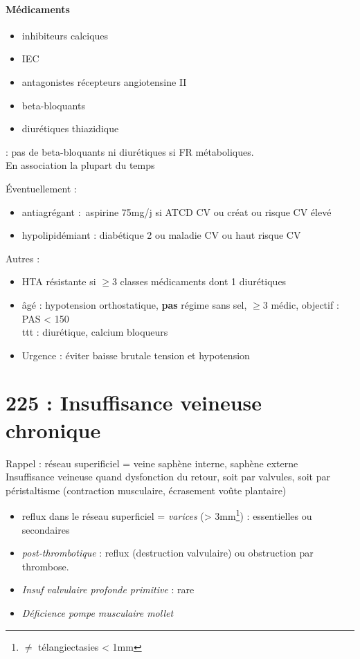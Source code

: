 \documentclass{article}
\begin{document}
\paragraph{Médicaments}
\begin{itemize}
  \item inhibiteurs calciques
  \item IEC
  \item antagonistes récepteurs angiotensine II
  \item beta-bloquants
  \item diurétiques thiazidique
\end{itemize}
\danger : pas de beta-bloquants ni diurétiques si FR métaboliques.\\

En association la plupart du temps

Éventuellement :
\begin{itemize}
  \item antiagrégant : aspirine 75mg/j si ATCD CV ou créat ou risque CV élevé
  \item hypolipidémiant : diabétique 2 ou maladie CV ou haut risque CV
\end{itemize}

Autres :
\begin{itemize}
  \item HTA résistante si $\ge 3$ classes médicaments dont 1 diurétiques
  \item âgé : \danger{} hypotension orthostatique, \textbf{pas} régime sans sel,
    $\ge 3$ médic, objectif : PAS < 150\\
    ttt : diurétique, calcium bloqueurs
  \item Urgence : éviter baisse brutale tension et hypotension \skull
\end{itemize}
\section{225 : Insuffisance veineuse chronique}%
\label{sec:225_insuffisance_veineuse_chronique}

Rappel : réseau superificiel = veine saphène interne, saphène externe\\
Insuffisance veineuse quand dysfonction du retour, soit par valvules, soit par
péristaltisme (contraction musculaire, écrasement voûte plantaire)

\begin{itemize}
  \item reflux dans le réseau superficiel = \textit{varices}  (>
    3mm\footnote{$\neq$ télangiectasies < 1mm}) : essentielles ou
    secondaires
  \item \textit{post-thrombotique} : reflux (destruction valvulaire) ou obstruction par thrombose. 
  \item \textit{Insuf valvulaire profonde primitive} : rare
  \item \textit{Déficience pompe musculaire mollet} 
\end{itemize}
\end{document}
